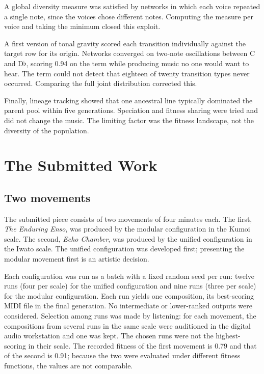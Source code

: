 \documentclass[conference]{IEEEtran}
\newcommand{\fl}{$\flat$}
\begin{document}
A global diversity measure was satisfied by networks in which each voice repeated a single note, since the voices chose different notes. Computing the measure per voice and taking the minimum closed this exploit.

A first version of tonal gravity scored each transition individually against the target row for its origin. Networks converged on two-note oscillations between C and D\fl, scoring 0.94 on the term while producing music no one would want to hear. The term could not detect that eighteen of twenty transition types never occurred. Comparing the full joint distribution corrected this.

Finally, lineage tracking showed that one ancestral line typically dominated the parent pool within five generations. Speciation and fitness sharing were tried and did not change the music. The limiting factor was the fitness landscape, not the diversity of the population.

\section{The Submitted Work}

\subsection{Two movements}

The submitted piece consists of two movements of four minutes each. The first, \emph{The Enduring Enso}, was produced by the modular configuration in the Kumoi scale. The second, \emph{Echo Chamber}, was produced by the unified configuration in the Iwato scale. The unified configuration was developed first; presenting the modular movement first is an artistic decision.

Each configuration was run as a batch with a fixed random seed per run: twelve runs (four per scale) for the unified configuration and nine runs (three per scale) for the modular configuration. Each run yields one composition, its best-scoring MIDI file in the final generation. No intermediate or lower-ranked outputs were considered. Selection among runs was made by listening: for each movement, the compositions from several runs in the same scale were auditioned in the digital audio workstation and one was kept. The chosen runs were not the highest-scoring in their scale. The recorded fitness of the first movement is 0.79 and that of the second is 0.91; because the two were evaluated under different fitness functions, the values are not comparable.
\end{document}
